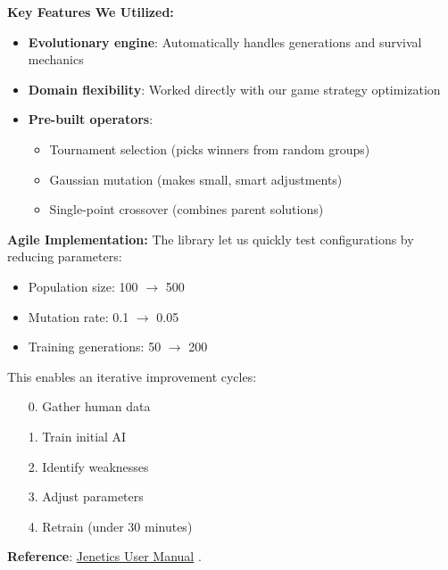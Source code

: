 \documentclass[sigconf]{acmart} %
\begin{document}
\textbf{Key Features We Utilized:}
\begin{itemize}
    \item \textbf{Evolutionary engine}: Automatically handles generations and survival mechanics
    \item \textbf{Domain flexibility}: Worked directly with our game strategy optimization
    \item \textbf{Pre-built operators}: 
    \begin{itemize}
        \item Tournament selection (picks winners from random groups)
        \item Gaussian mutation (makes small, smart adjustments)
        \item Single-point crossover (combines parent solutions)
    \end{itemize}
\end{itemize}

\textbf{Agile Implementation:}
The library let us quickly test configurations by reducing parameters:
\begin{itemize}
    \item Population size: 100 $\rightarrow$ 500 
    \item Mutation rate: 0.1 $\rightarrow$ 0.05 
    \item Training generations: 50 $\rightarrow$ 200 
\end{itemize}

This enables an iterative improvement cycles:
\begin{itemize}

    \item [0.] Gather human data
    \item [1.] Train initial AI
    \item [2.] Identify weaknesses
    \item [3.] Adjust parameters
    \item [4.] Retrain (under 30 minutes)
    

\end{itemize}
\noindent\textbf{Reference}: \href{https://jenetics.io/manual/manual-8.2.0.pdf}{Jenetics User Manual} \cite{jenetics2024}.
\end{document}
